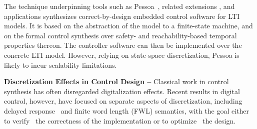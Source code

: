 \documentclass[twocolumn]{autart}    %
\begin{document}
The technique underpinning tools such as Pessoa~\cite{mazo2010pessoa}, related extensions \cite{Anta2010,liu16}, and applications \cite{zamani2014}
synthesizes correct-by-design embedded control software for LTI models.    
It is based on the abstraction of the model to a finite-state machine, 
and on the formal control synthesis over safety- and reachability-based temporal properties thereon.  
The controller software can then be implemented over the concrete LTI model. 
However, relying on state-space discretization, \mbox{Pessoa} is likely to incur scalability limitations.   

\textbf{Discretization Effects in Control Design --}
Classical work in control synthesis has often disregarded digitalization effects.
Recent results in digital control, however, have focused on separate aspects of discretization, 
including delayed response~\cite{Duggirala2015} and finite word length (FWL) semantics, 
with the goal either to verify~\cite{daes20161} the correctness of the implementation or to optimize~\cite{oudjida2014design} the design.
\end{document}
